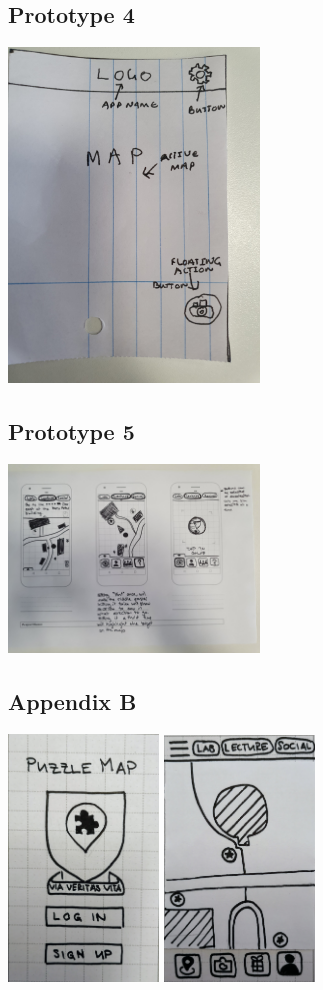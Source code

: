\documentclass[10pt,twocolumn]{article} %
\begin{document}
\subsection*{Prototype 4}
\includegraphics[width=0.5\textwidth]{./figures/shauns_initial_proto/1.jpg}

\subsection*{Prototype 5}
\includegraphics[width=0.5\textwidth]{./figures/belindas_initial_proto/1.jpg}

\newpage
\subsection*{Appendix B}
\includegraphics[width=0.3\textwidth]{./figures/refined_proto/1.jpg}
\includegraphics[width=0.3\textwidth]{./figures/refined_proto/2.jpg}
\end{document}
